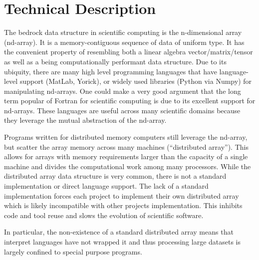 \documentclass[letterpaper,12pt]{article}
\begin{document}

\section*{Technical Description}

The bedrock data structure in scientific computing is the n-dimensional array (nd-array).  It is a memory-contiguous sequence of data of uniform type.  It has the convenient property of resembling both a linear algebra vector/matrix/tensor as well as a being computationally performant data structure.  Due to its ubiquity, there are many high level programming languages that have language-level support (MatLab\cite{matlab}, Yorick\cite{Munro1995}), or widely used libraries (Python\cite{CPython} via Numpy\cite{Oliphant2006}) for manipulating nd-arrays.  One could make a very good argument that the long term popular of Fortran for scientific computing is due to its excellent support for nd-arrays.  These languages are useful across many scientific domains because they leverage the mutual abstraction of the nd-array.

Programs written for distributed memory computers still leverage the nd-array, but scatter the array memory across many machines (``distributed array'').  This allows for arrays with memory requirements larger than the capacity of a single machine and divides the computational work among many processors.  While the distributed array data structure is very common, there is not a standard implementation or direct language support.  The lack of a standard implementation forces each project to implement their own distributed array which is likely incompatible with other projects implementation.  This inhibits code and tool reuse and slows the evolution of scientific software.

In particular, the non-existence of a standard distributed array means that interpret languages have not wrapped it and thus processing large datasets is largely confined to special purpose programs.
\end{document}
